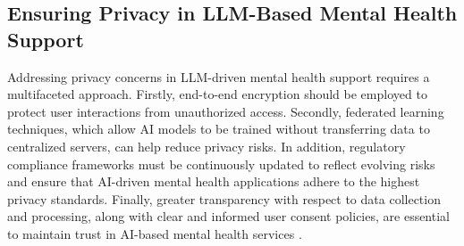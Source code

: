 \subsection{Ensuring Privacy in LLM-Based Mental Health Support}
Addressing privacy concerns in LLM-driven mental health support requires a multifaceted approach. Firstly, end-to-end encryption should be employed to protect user interactions from unauthorized access. Secondly, federated learning techniques, which allow AI models to be trained without transferring data to centralized servers, can help reduce privacy risks. In addition, regulatory compliance frameworks must be continuously updated to reflect evolving risks and ensure that AI-driven mental health applications adhere to the highest privacy standards. Finally, greater transparency with respect to data collection and processing, along with clear and informed user consent policies, are essential to maintain trust in AI-based mental health services \cite{Volkmer2024-xw,Iwaya2022-ut}.

